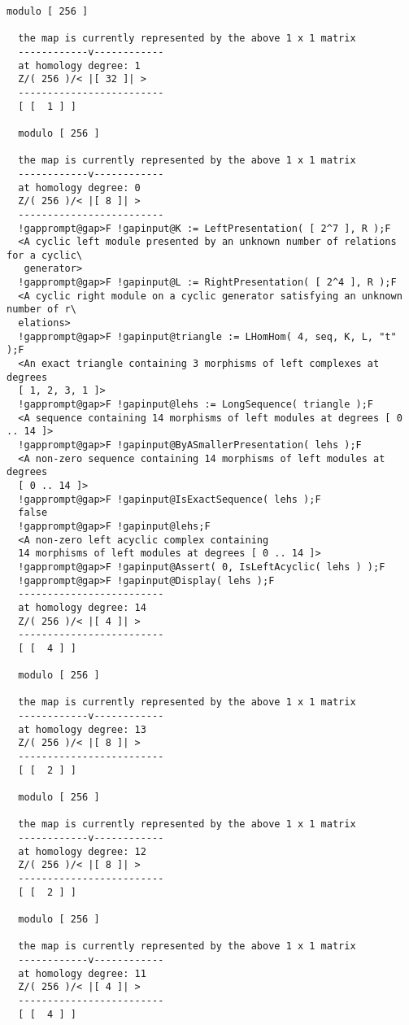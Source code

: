 \documentclass[a4paper,11pt]{report}
\begin{document}
{{{\begin{Verbatim}[commandchars=!@F,fontsize=\small,frame=single,label=Example]
  modulo [ 256 ]
  
  the map is currently represented by the above 1 x 1 matrix
  ------------v------------
  at homology degree: 1
  Z/( 256 )/< |[ 32 ]| > 
  -------------------------
  [ [  1 ] ]
  
  modulo [ 256 ]
  
  the map is currently represented by the above 1 x 1 matrix
  ------------v------------
  at homology degree: 0
  Z/( 256 )/< |[ 8 ]| > 
  -------------------------
  !gapprompt@gap>F !gapinput@K := LeftPresentation( [ 2^7 ], R );F
  <A cyclic left module presented by an unknown number of relations for a cyclic\
   generator>
  !gapprompt@gap>F !gapinput@L := RightPresentation( [ 2^4 ], R );F
  <A cyclic right module on a cyclic generator satisfying an unknown number of r\
  elations>
  !gapprompt@gap>F !gapinput@triangle := LHomHom( 4, seq, K, L, "t" );F
  <An exact triangle containing 3 morphisms of left complexes at degrees 
  [ 1, 2, 3, 1 ]>
  !gapprompt@gap>F !gapinput@lehs := LongSequence( triangle );F
  <A sequence containing 14 morphisms of left modules at degrees [ 0 .. 14 ]>
  !gapprompt@gap>F !gapinput@ByASmallerPresentation( lehs );F
  <A non-zero sequence containing 14 morphisms of left modules at degrees 
  [ 0 .. 14 ]>
  !gapprompt@gap>F !gapinput@IsExactSequence( lehs );F
  false
  !gapprompt@gap>F !gapinput@lehs;F
  <A non-zero left acyclic complex containing 
  14 morphisms of left modules at degrees [ 0 .. 14 ]>
  !gapprompt@gap>F !gapinput@Assert( 0, IsLeftAcyclic( lehs ) );F
  !gapprompt@gap>F !gapinput@Display( lehs );F
  -------------------------
  at homology degree: 14
  Z/( 256 )/< |[ 4 ]| > 
  -------------------------
  [ [  4 ] ]
  
  modulo [ 256 ]
  
  the map is currently represented by the above 1 x 1 matrix
  ------------v------------
  at homology degree: 13
  Z/( 256 )/< |[ 8 ]| > 
  -------------------------
  [ [  2 ] ]
  
  modulo [ 256 ]
  
  the map is currently represented by the above 1 x 1 matrix
  ------------v------------
  at homology degree: 12
  Z/( 256 )/< |[ 8 ]| > 
  -------------------------
  [ [  2 ] ]
  
  modulo [ 256 ]
  
  the map is currently represented by the above 1 x 1 matrix
  ------------v------------
  at homology degree: 11
  Z/( 256 )/< |[ 4 ]| > 
  -------------------------
  [ [  4 ] ]
  

\end{Verbatim}}}}
\end{document}
